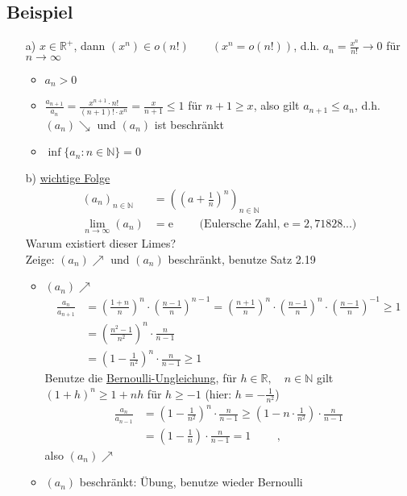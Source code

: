 \documentclass[12pt, titlepage]{article}
\newcommand{\R}{\mathds{R}}
\newcommand{\N}{\mathds{N}}
\newcommand{\e}{\textrm{e}}
\newcommand{\infn}{n\rightarrow\infty}
\renewcommand{\*}{\cdot}
\begin{document}
	\subsection{Beispiel}
	\begin{itemize}
		\item[a)] $x\in\R^+$, dann $(x^n)\in o(n!)\qquad(x^n=o(n!))$, d.h. $a_n=\frac{x^n}{n!}\rightarrow 0$ für $\infn$
		\begin{itemize}
			\item $a_n>0$
			\item $\frac{a_{n+1}}{a_n}=\frac{x^{n+1}\*n!}{(n+1)!\*x^n}=\frac{x}{n+1}\leq 1$ für $n+1\geq x$, also gilt $a_{n+1}\leq a_n$, d.h. $(a_n)\searrow$ und $(a_n)$ ist beschränkt
			\item $\inf\{a_n\colon n\in\N\}=0$
		\end{itemize}
		\item[b)] \underline{wichtige Folge}\\
		\begin{align*}
			(a_n)_{n\in\N}&=((a+\frac{1}{n})^n)_{n\in\N}\\
			\lim\limits_{\infn}(a_n)&=\e\qquad\textrm{ (Eulersche Zahl, $\e=2,71828...$)}
		\end{align*}
		Warum existiert dieser Limes?\\
		Zeige: $(a_n)\nearrow$ und $(a_n)$ beschränkt, benutze Satz 2.19
		\begin{itemize}
			\item $(a_n)\nearrow$
			\begin{align*}
				\frac{a_n}{a_{n+1}}&=(\frac{1+n}{n})^n\*(\frac{n-1}{n})^{n-1}=(\frac{n+1}{n})^n\*(\frac{n-1}{n})^n\*(\frac{n-1}{n})^{-1}\geq 1\\
				&=(\frac{n^2-1}{n^2})^n\*\frac{n}{n-1}\\
				&=(1-\frac{1}{n^2})^n\*\frac{n}{n-1}\geq 1
			\end{align*}
			Benutze die \underline{Bernoulli-Ungleichung}, für $h\in\R,\quad n\in\N$ gilt $(1+h)^n\geq 1+nh$ für $h\geq -1$ (hier: $h=-\frac{1}{n^2}$)
			\begin{align*}
				\frac{a_n}{a_{n-1}}&=(1-\frac{1}{n^2})^n\*\frac{n}{n-1}\geq (1-n\*\frac{1}{n^2})\*\frac{n}{n-1}\\
				&=(1-\frac{1}{n})\*\frac{n}{n-1}=1\qquad\textrm{ , }
			\end{align*}
			also $(a_n)\nearrow$
			\item $(a_n)$ beschränkt: Übung, benutze wieder Bernoulli
		\end{itemize}
	\end{itemize}
\end{document}

